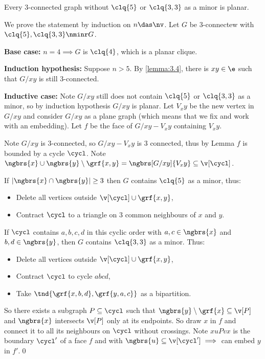 \begin{customlemma}{4.16}
\label{lemma:4.16}
    Every $3$-connected graph without $\clq{5}$ or $\clq{3, 3}$ as a minor is planar.
\end{customlemma}
\begin{prf}
    We prove the statement by induction on $n \das \nv$. Let $G$ be $3$-connectew with $\clq{5}, \clq{3, 3} \nminr G$.

    \textbf{Base case: } $n = 4 \implies G$ is $\clq{4}$, which is a planar clique. 
    
    \textbf{Induction hypothesis: }Suppose $n > 5$. By \ref{lemma:3.4}, there is $xy \in \e$ such that $G / xy$ is still $3$-connected. 
    
    \textbf{Inductive case: }Note $G / xy$ still does not contain $\clq{5}$ or $\clq{3, 3}$ as a minor, so by induction hypothesis $G / xy$ is planar. Let $V_xy$ be the new vertex in $G / xy$ and consider $G /xy$ as a plane graph (which means that we fix and work with an embedding). Let $f$ be the face of $G / xy - V_xy$ containing $V_xy$.

    Note $G / xy$ is $3$-connected, so $G / xy - V_xy$ is 3 connected, thus by Lemma $f$ is bounded by a cycle $\cycl$. Note $\ngbrs{x} \cup \ngbrs{y} \setminus \grf{x, y} = \ngbrs[G / xy]{V_xy} \subseteq \v[\cycl]$.

    If $|\ngbrs{x} \cap \ngbrs{y}| \geq 3$ then $G$ contains $\clq{5}$ as a minor, thus:
    \begin{itemize}
        \item Delete all vertices outside $\v[\cycl] \cup \grf{x, y}$,
        \item Contract $\cycl$ to a triangle on $3$ common neighbours of $x$ and $y$.
    \end{itemize}
    If $\cycl$ contains $a, b, c, d$ in this cyclic order with $a, c \in \ngbrs{x}$ and $b, d \in \ngbrs{y}$, then $G$ contains $\clq{3, 3}$ as a minor. Thus:
    \begin{itemize}
        \item Delete all vertices outside $\v[\cycl] \cup \grf{x, y}$,
        \item Contract $\cycl$ to cycle $abcd$,
        \item Take $\tnd{\grf{x, b, d}, \grf{y, a, c}}$ as a bipartition.
    \end{itemize}

    So there exists a subgraph $P \subseteq \cycl$ such that $\ngbrs{y} \setminus \grf{x} \subseteq \v[P]$ and $\ngbrs{x}$ intersects $\v[P]$ only at its endpoints. So draw $x$ in $f$ and connect it to all its neighbours on $\cycl$ without crossings. Note $xuPvx$ is the boundary $\cycl'$ of a face $f$ and with $\ngbrs{u} \subseteq \v[\cycl'] \implies$ can embed $y$ in $f'$.\qed
\end{prf}
